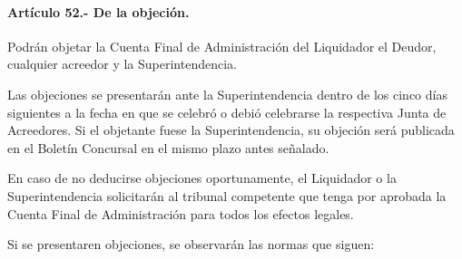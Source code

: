 \documentclass[
]{book}
\begin{document}
\hypertarget{artuxedculo-52.--de-la-objeciuxf3n.}{%
\paragraph*{Artículo 52.- De la objeción.}\label{artuxedculo-52.--de-la-objeciuxf3n.}}

Podrán objetar la Cuenta Final de Administración del Liquidador el Deudor, cualquier acreedor y la Superintendencia.

Las objeciones se presentarán ante la Superintendencia dentro de los cinco días siguientes a la fecha en que se celebró o debió celebrarse la respectiva Junta de Acreedores. Si el objetante fuese la Superintendencia, su objeción será publicada en el Boletín Concursal en el mismo plazo antes señalado.

En caso de no deducirse objeciones oportunamente, el Liquidador o la Superintendencia solicitarán al tribunal competente que tenga por aprobada la Cuenta Final de Administración para todos los efectos legales.

Si se presentaren objeciones, se observarán las normas que siguen:
\end{document}

